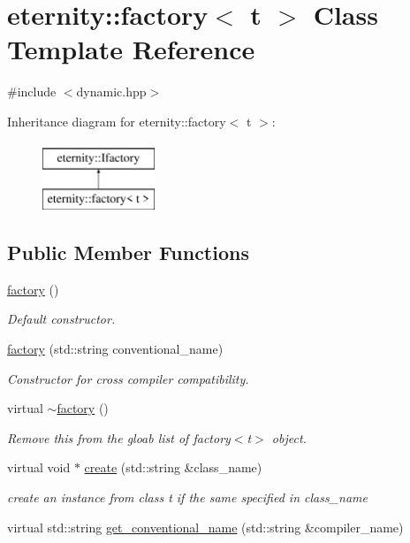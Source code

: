 \hypertarget{classeternity_1_1factory}{}\section{eternity\+:\+:factory$<$ t $>$ Class Template Reference}
\label{classeternity_1_1factory}


{\ttfamily \#include $<$dynamic.\+hpp$>$}

Inheritance diagram for eternity\+:\+:factory$<$ t $>$\+:\begin{figure}[H]
\begin{center}
\leavevmode
\includegraphics[height=2.000000cm]{classeternity_1_1factory}
\end{center}
\end{figure}
\subsection*{Public Member Functions}
\begin{DoxyCompactItemize}
\item 
\hyperlink{classeternity_1_1factory_a0fc6f0a6ec7ef7057f06924b948d8c94}{factory} ()
\begin{DoxyCompactList}\small\item\em Default constructor. \end{DoxyCompactList}\item 
\hyperlink{classeternity_1_1factory_aabaf1fee796b93628f897af8ac9c3ea9}{factory} (std\+::string conventional\+\_\+name)
\begin{DoxyCompactList}\small\item\em Constructor for cross compiler compatibility. \end{DoxyCompactList}\item 
virtual \hyperlink{classeternity_1_1factory_a5abc378892135b2d5491d7380752bb84}{$\sim$factory} ()
\begin{DoxyCompactList}\small\item\em Remove this from the gloab list of factory$<$t$>$ object. \end{DoxyCompactList}\item 
virtual void $\ast$ \hyperlink{classeternity_1_1factory_a08c1c494bc749955f9b0767d31933c2b}{create} (std\+::string \&class\+\_\+name)
\begin{DoxyCompactList}\small\item\em create an instance from class t if the same specified in class\+\_\+name \end{DoxyCompactList}\item 
virtual std\+::string \hyperlink{classeternity_1_1factory_a0b7c7bc194b178379eb1b880f87d3b48}{get\+\_\+conventional\+\_\+name} (std\+::string \&compiler\+\_\+name)
\end{DoxyCompactItemize}
